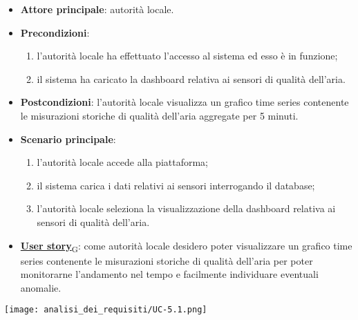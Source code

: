 \begin{itemize}
	\item \textbf{Attore principale}: autorità locale.
	\item \textbf{Precondizioni}:
	      \begin{enumerate}
		      \item l'autorità locale ha effettuato l'accesso al sistema ed esso è in funzione;
		      \item il sistema ha caricato la dashboard relativa ai sensori di qualità dell'aria.
	      \end{enumerate}
	\item \textbf{Postcondizioni}: l'autorità locale visualizza un grafico time series contenente le misurazioni storiche
	      di qualità dell'aria aggregate per 5 minuti.
	\item \textbf{Scenario principale}:
	      \begin{enumerate}
		      \item l'autorità locale accede alla piattaforma;
		      \item il sistema carica i dati relativi ai sensori interrogando il database;
		      \item l'autorità locale seleziona la visualizzazione della dashboard relativa ai sensori di qualità dell'aria.
	      \end{enumerate}
	\item \href{https://7last.github.io/docs/rtb/documentazione-interna/glossario\#user-story}{\textbf{User story}\textsubscript{G}}:
	      come autorità locale desidero poter visualizzare un grafico time series contenente le misurazioni storiche
	      di qualità dell'aria per poter monitorarne l'andamento nel tempo e facilmente individuare eventuali anomalie.
\end{itemize}
\begin{center}
	\texttt{[image: analisi\_dei\_requisiti/UC-5.1.png]}
\end{center}


